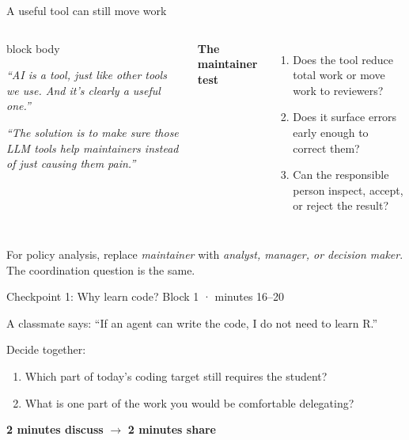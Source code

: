 \begin{frame}{A useful tool can still move work}
  \begin{columns}[T,onlytextwidth]
      \RaggedRight
      \begin{beamercolorbox}[sep=0.72em,wd=\linewidth]{block body}
        {\small\itshape
        ``AI is a tool, just like other tools we use. And it's clearly a
        useful one.''\par}

        \vspace{0.55em}
        {\small\itshape
        ``The solution is to make sure those LLM tools help maintainers
        instead of just causing them pain.''\par}
      \end{beamercolorbox}
      \RaggedRight
      \textbf{The maintainer test}
      \begin{enumerate}
        \item Does the tool reduce total work or move work to reviewers?
        \item Does it surface errors early enough to correct them?
        \item Can the responsible person inspect, accept, or reject the result?
      \end{enumerate}
  \end{columns}

  \vfill
  For policy analysis, replace \emph{maintainer} with \emph{analyst, manager,
  or decision maker}. The coordination question is the same.

  \vfill
\end{frame}

\begin{frame}{Checkpoint 1: Why learn code?}
  \alert{Block 1 · minutes 16--20}

  \vspace{0.65em}
  A classmate says: ``If an agent can write the code, I do not need to learn R.''

  \vspace{0.65em}
  Decide together:
  \begin{enumerate}
    \item Which part of today's coding target still requires the student?
    \item What is one part of the work you would be comfortable delegating?
  \end{enumerate}

  \vfill
  \begin{center}
    \textbf{2 minutes discuss} \hspace{2.0em} $\longrightarrow$ \hspace{2.0em}
    \textbf{2 minutes share}
  \end{center}
\end{frame}

